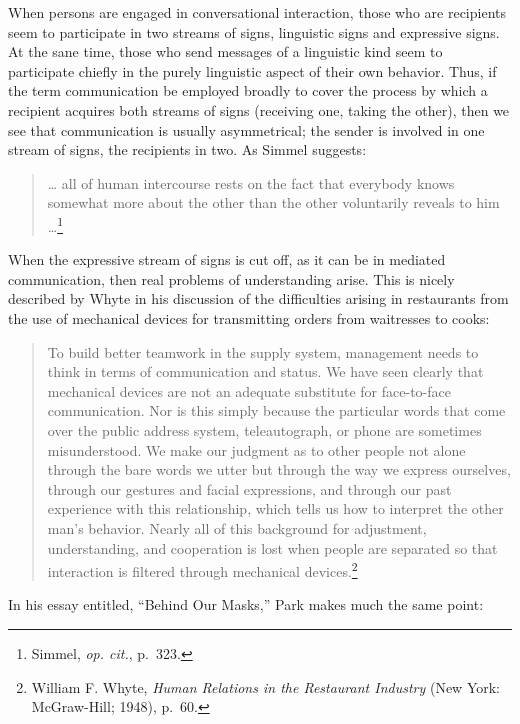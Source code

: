 \documentclass[openany,nobib]{tufte-book}
\begin{document}
When persons are engaged in conversational interaction, those who are
recipients seem to participate in two streams of signs, linguistic signs
and expressive signs. At the sane time, those who send messages of a
linguistic kind seem to participate chiefly in the purely linguistic
aspect of their own behavior. Thus, if the term communication be
employed broadly to cover the process by which a recipient acquires both
streams of signs (re­ceiving one, taking the other), then we see that
communication is usually asymmetrical; the sender is involved in one
stream of signs, the recipients in two. As Simmel suggests:

\begin{quote}
\ldots{} all of human intercourse rests on the fact that every­body knows
somewhat more about the other than the other voluntarily reveals to him
\ldots{}\footnote{Simmel, \emph{op. cit.}, p.~323.}
\end{quote}

\noindent When the expressive stream of signs is cut off, as it can be in mediated
communication, then real problems of understanding arise. This is nicely
described by Whyte in his discussion of the difficulties arising in
restaurants from the use of mechani­cal devices for transmitting orders
from waitresses to cooks:

\begin{quote}
To build better teamwork in the supply system, management needs to think
in terms of communication and status. We have seen clearly that
mechanical devices are not an adequate substitute for face-to-face
communication. Nor is this simply because the particular words that come
over the pub­lic address system, teleautograph, or phone are sometimes
misunderstood. We make our judgment as to other people not alone through
the bare words we utter but through the way we express ourselves,
through our gestures and facial expres­sions, and through our past
experience with this relation­ship, which tells us how to interpret the
other man's be­havior. Nearly all of this background for adjustment,
understanding, and cooperation is lost when people are separated so that
interaction is filtered through mechanical devices.\footnote{William F.
  Whyte, \emph{Human Relations in the Restaurant Industry} (New York:
  McGraw-Hill; 1948), p.~60.}
\end{quote}

\noindent In his essay entitled, ``Behind Our Masks,'' Park makes much the same
point:
\end{document}
